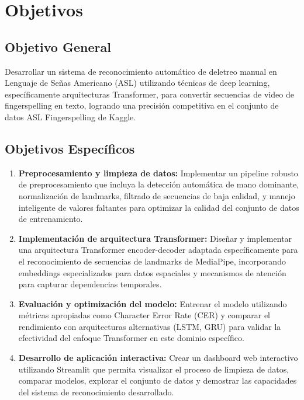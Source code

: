 \documentclass[12pt,a4paper]{article}
\begin{document}
\section{Objetivos}

\subsection{Objetivo General}

Desarrollar un sistema de reconocimiento automático de deletreo manual en Lenguaje de Señas Americano (ASL) utilizando técnicas de deep learning, específicamente arquitecturas Transformer, para convertir secuencias de video de fingerspelling en texto, logrando una precisión competitiva en el conjunto de datos ASL Fingerspelling de Kaggle.

\subsection{Objetivos Específicos}

\begin{enumerate}
    \item \textbf{Preprocesamiento y limpieza de datos:} Implementar un pipeline robusto de preprocesamiento que incluya la detección automática de mano dominante, normalización de landmarks, filtrado de secuencias de baja calidad, y manejo inteligente de valores faltantes para optimizar la calidad del conjunto de datos de entrenamiento.

    \item \textbf{Implementación de arquitectura Transformer:} Diseñar y implementar una arquitectura Transformer encoder-decoder adaptada específicamente para el reconocimiento de secuencias de landmarks de MediaPipe, incorporando embeddings especializados para datos espaciales y mecanismos de atención para capturar dependencias temporales.

    \item \textbf{Evaluación y optimización del modelo:} Entrenar el modelo utilizando métricas apropiadas como Character Error Rate (CER) y comparar el rendimiento con arquitecturas alternativas (LSTM, GRU) para validar la efectividad del enfoque Transformer en este dominio específico.

    \item \textbf{Desarrollo de aplicación interactiva:} Crear un dashboard web interactivo utilizando Streamlit que permita visualizar el proceso de limpieza de datos, comparar modelos, explorar el conjunto de datos y demostrar las capacidades del sistema de reconocimiento desarrollado.
\end{enumerate}
\end{document}
